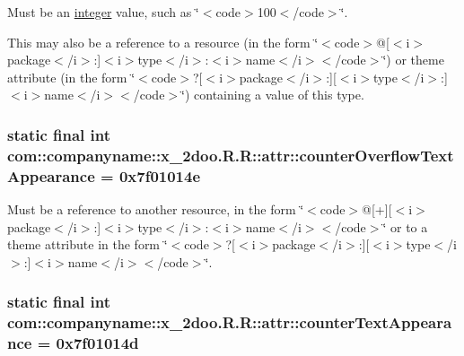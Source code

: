 Must be an \hyperlink{classcom_1_1companyname_1_1x__2doo_1_1_r_1_1integer}{integer} value, such as \char`\"{}$<$code$>$100$<$/code$>$\char`\"{}. 

This may also be a reference to a resource (in the form \char`\"{}$<$code$>$@\mbox{[}$<$i$>$package$<$/i$>$:\mbox{]}$<$i$>$type$<$/i$>$:$<$i$>$name$<$/i$>$$<$/code$>$\char`\"{}) or theme attribute (in the form \char`\"{}$<$code$>$?\mbox{[}$<$i$>$package$<$/i$>$:\mbox{]}\mbox{[}$<$i$>$type$<$/i$>$:\mbox{]}$<$i$>$name$<$/i$>$$<$/code$>$\char`\"{}) containing a value of this type. \hypertarget{classcom_1_1companyname_1_1x__2doo_1_1_r_1_1attr_dd1e934cbf2f7cdb22608f0bb3938a3e}{
\subsubsection[{counterOverflowTextAppearance}]{\setlength{\rightskip}{0pt plus 5cm}static final int com::companyname::x\_\-2doo.R.R::attr::counterOverflowTextAppearance = 0x7f01014e}}
\label{classcom_1_1companyname_1_1x__2doo_1_1_r_1_1attr_dd1e934cbf2f7cdb22608f0bb3938a3e}


Must be a reference to another resource, in the form \char`\"{}$<$code$>$@\mbox{[}+\mbox{]}\mbox{[}$<$i$>$package$<$/i$>$:\mbox{]}$<$i$>$type$<$/i$>$:$<$i$>$name$<$/i$>$$<$/code$>$\char`\"{} or to a theme attribute in the form \char`\"{}$<$code$>$?\mbox{[}$<$i$>$package$<$/i$>$:\mbox{]}\mbox{[}$<$i$>$type$<$/i$>$:\mbox{]}$<$i$>$name$<$/i$>$$<$/code$>$\char`\"{}. \hypertarget{classcom_1_1companyname_1_1x__2doo_1_1_r_1_1attr_819ed9953ffe3f04964f8dd2efafeb6e}{
\subsubsection[{counterTextAppearance}]{\setlength{\rightskip}{0pt plus 5cm}static final int com::companyname::x\_\-2doo.R.R::attr::counterTextAppearance = 0x7f01014d}}
\label{classcom_1_1companyname_1_1x__2doo_1_1_r_1_1attr_819ed9953ffe3f04964f8dd2efafeb6e}


